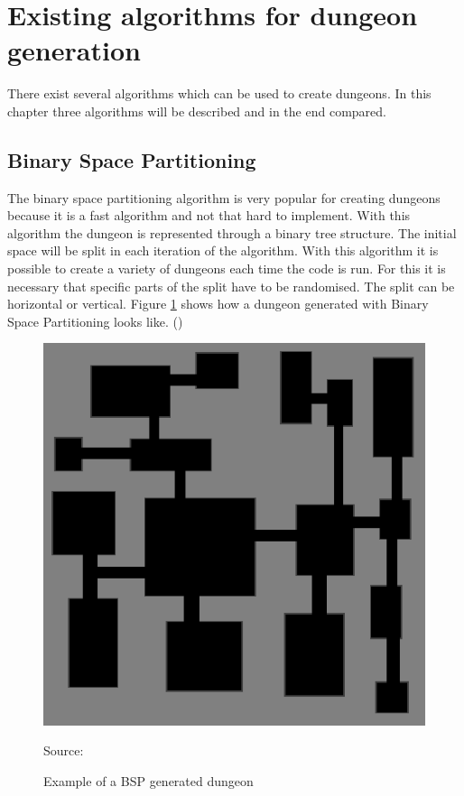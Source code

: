 \documentclass[a4paper,12pt,oneside]{scrreprt}
\begin{document}
\section{Existing algorithms for dungeon generation}
There exist several algorithms which can be used to create dungeons. In this chapter three algorithms will be described and in the end compared. 

\subsection{Binary Space Partitioning}
The binary space partitioning algorithm is very popular for creating dungeons because it is a fast algorithm and not that hard to implement. With this algorithm the dungeon is represented through a binary tree structure. The initial space will be split in each iteration of the algorithm. With this algorithm it is possible to create a variety of dungeons each time the code is run. For this it is necessary that specific parts of the split have to be randomised. The split can be horizontal or vertical. Figure \ref{fig:bsp_example} shows how a dungeon generated with Binary Space Partitioning looks like. (\cite[][]{williams_investigation_nodate})

\begin{figure}[htb]
\centering
\includegraphics[scale=0.5]{images/bsp_example.png} 
\caption{Example of a BSP generated dungeon}
Source: \cite[][]{williams_investigation_nodate}
\label{fig:bsp_example}
\end{figure}
\end{document}
